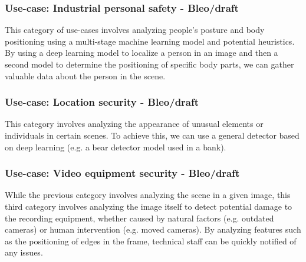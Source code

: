 \documentclass{article}
\begin{document}
    \subsubsection{Use-case: Industrial personal safety - Bleo/draft}
    This category of use-cases involves analyzing people's posture and body positioning using a multi-stage machine learning model and potential heuristics. By using a deep learning model to localize a person in an image and then a second model to determine the positioning of specific body parts, we can gather valuable data about the person in the scene.

    \subsubsection{Use-case: Location security - Bleo/draft}
    This category involves analyzing the appearance of unusual elements or individuals in certain scenes. To achieve this, we can use a general detector based on deep learning (e.g. a bear detector model used in a bank).

    \subsubsection{Use-case: Video equipment security - Bleo/draft}
    While the previous category involves analyzing the scene in a given image, this third category involves analyzing the image itself to detect potential damage to the recording equipment, whether caused by natural factors (e.g. outdated cameras) or human intervention (e.g. moved cameras). By analyzing features such as the positioning of edges in the frame, technical staff can be quickly notified of any issues.
\end{document}

